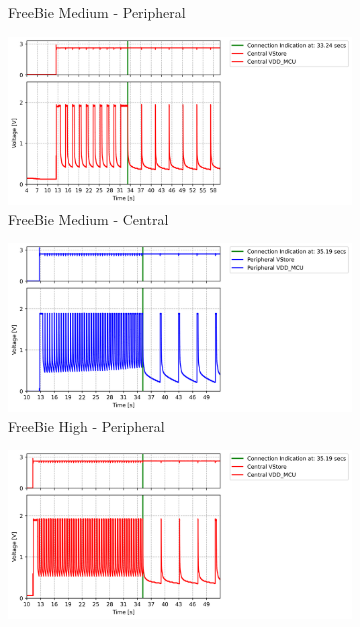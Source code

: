 \begin{figure}[t]
\begin{subfigure}{0.5\linewidth}
        \caption{\scriptsize{FreeBie Medium - Peripheral}}
        \vspace{1\baselineskip}
    \end{subfigure}\hfill
    \begin{subfigure}{0.5\linewidth}
        \centering
        \includegraphics[width=1\linewidth]{chapters/Results/Connection_Freebie_medium_central.png}
        \caption{\scriptsize{FreeBie Medium - Central}}
        \vspace{1\baselineskip}
    \end{subfigure}
    \begin{subfigure}{0.5\linewidth}
        \centering
        \includegraphics[width=1\linewidth]{chapters/Results/Connection_Freebie_high_peripheral.png}
        \caption{\scriptsize{FreeBie High - Peripheral}}
    \end{subfigure} \hfill
    \begin{subfigure}{0.5\linewidth}
        \centering
        \includegraphics[width=1\linewidth]{chapters/Results/Connection_Freebie_high_central.png}

\end{subfigure}
\end{figure}
